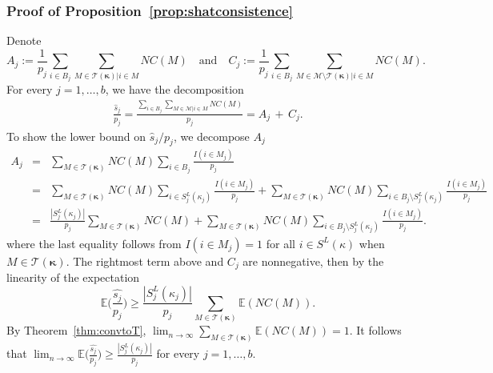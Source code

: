 \documentclass[
  12pt]{article}
\newcommand{\E}{\mathbb{E}}
\newcommand{\M}{\mathcal{M}}
\newcommand{\T}{\mathcal{T}}
\newcommand{\bkappa}{\boldsymbol{\kappa}}
\begin{document}
\subsubsection{Proof of Proposition~\ref{prop:shatconsistence}}
Denote
$$A_j:=\frac{1}{p_j}\sum_{i \in B_j}\sum_{M \in \T(\bkappa)|i\in M}NC(M) \quad\text{and}\quad  C_j:=\frac{1}{p_j}\sum_{i \in B_j}\sum_{M \in \M\setminus \T(\bkappa)|i\in M}NC(M).$$
For every $j=1,\ldots,b$, we have the decomposition
\begin{gather}\label{eq:decompshat}
    \frac{\hat{s}_j}{p_j}
    =\frac{\sum_{i \in B_j} \sum_{M \in \M | i \in M} NC(M)}{p_j}
   =A_j\,+\, C_j.
\end{gather}
To show the lower bound on $\hat{s}_j/p_j$, we decompose $A_j$
\begin{eqnarray}
  A_j
   &=& \sum_{M \in \T(\bkappa)}NC(M)\sum_{i \in B_j}\frac{I(i\in M_j)}{p_j}\nonumber\\
   &=& \sum_{M \in \T(\bkappa)}NC(M)\sum_{i \in S_j^{L}(\kappa_j)}\frac{I(i\in M_j)}{p_j}+\sum_{M \in \T(\bkappa)}NC(M)\sum_{i \in B_j\setminus S_j^{L}(\kappa_j)}\frac{I(i\in M_j)}{p_j}\nonumber\\
   &=& \frac{|S_j^{L}(\kappa_j)|}{p_j}\sum_{M \in \T(\bkappa)}NC(M)+\sum_{M \in \T(\bkappa)}NC(M)\sum_{i \in B_j\setminus S_j^{L}(\kappa_j)}\frac{I(i\in M_j)}{p_j}\label{eq:wigr}.
\end{eqnarray}
where the last equality follows from $I(i\in M_j)=1$ for all $i\in S^L(\kappa)$ when $M\in\T(\bkappa)$. The rightmost term above and $C_j$ are nonnegative, then by the linearity of the expectation
$$\E\Big(\frac{\widehat{s_j}}{p_j}\Big)\geq\frac{|S_j^{L}(\kappa_j)|}{p_j}\sum_{M \in \T(\bkappa)}\E(NC(M)).$$
By Theorem~\ref{thm:convtoT}, $\lim_{n\to\infty}\sum_{M \in \T(\bkappa)}\E(NC(M))=1$. It follows that $\lim_{n\to\infty}\E\Big(\frac{\widehat{s_j}}{p_j}\Big)\geq \frac{|S_j^{L}(\kappa_j)|}{p_j}$ for every $j=1,\ldots,b$.
\end{document}
